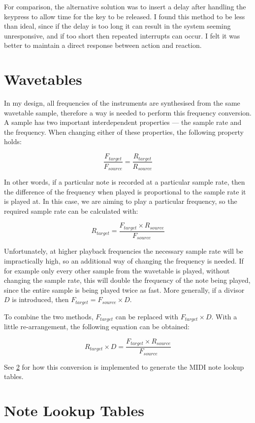 For comparison, the alternative solution was to insert a delay after handling the keypress to allow 
time for the key to be released.  I found this method to be less than ideal, since if the delay is 
too long it can result in the system seeming unresponsive, and if too short then repeated interrupts 
can occur.  I felt it was better to maintain a direct response between action and reaction.


\section{Wavetables}
\label{sec:design:wavetables}

In my design, all frequencies of the instruments are synthesised from the same wavetable sample, 
therefore a way is needed to perform this frequency conversion.  A sample has two important 
interdependent properties --- the sample rate and the frequency.  When changing either of these 
properties, the following property holds:

\[\frac{F_{target}}{F_{source}} = \frac{R_{target}}{R_{source}}\]

In other words, if a particular note is recorded at a particular sample rate, then the difference of 
the frequency when played is proportional to the sample rate it is played at.  In this case, we are 
aiming to play a particular frequency, so the required sample rate can be calculated with:

\[R_{target} = \frac{F_{target} \times R_{source}}{F_{source}}\]

Unfortunately, at higher playback frequencies the necessary sample rate will be impractically high, 
so an additional way of changing the frequency is needed.  If for example only every other sample 
from the wavetable is played, without changing the sample rate, this will double the frequency of 
the note being played, since the entire sample is being played twice as fast.  More generally, if a 
divisor $D$ is introduced, then $F_{target} = F_{source} \times D$.

To combine the two methods, $F_{target}$ can be replaced with $F_{target} \times D$.  With a little 
re-arrangement, the following equation can be obtained:

\[R_{target} \times D = \frac{F_{target} \times R_{source}}{F_{source}}\]

See \ref{sec:design:lookup-tables} for how this conversion is implemented to generate the MIDI note 
lookup tables.


\section{Note Lookup Tables}
\label{sec:design:lookup-tables}

